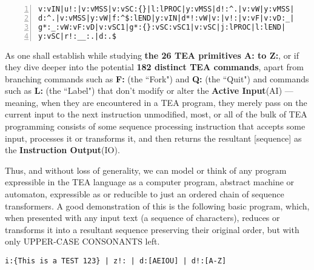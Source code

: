 \documentclass[12pt,a4paper]{article}
\begin{document}
 \small
  \begin{tcolorbox}[teaterminalstyle, title=TEA Program: SC-Generator Minified, breakable]
  \begin{lstlisting}[language=TEA, caption={SC-Generator Minified}, label={LSTSCGENMINI}, numbers=left]
v:vIN|u!:|v:vMSS|v:vSC:{}|l:lPROC|y:vMSS|d!:^.|v:vW|y:vMSS|
d:^.|v:vMSS|y:vW|f:^$:lEND|y:vIN|d*!:vW|v:|v!:|v:vF|v:vD:_|
g*:_:vW:vF:vD|v:vSC1|g*:{}:vSC:vSC1|v:vSC|j:lPROC|l:lEND|
y:vSC|r!:__:.|d:.$
   \end{lstlisting}
  \end{tcolorbox}
  \vspace{1cm}
  
 
 As one shall establish while studying \textbf{the 26 TEA primitives A: to Z:}\cite{Lutalo2024TEATAZ}, or if they dive deeper into the potential \textbf{182 distinct TEA commands}\cite{Lutalo2024TEATAZ}, apart from branching commands such as \textbf{F:} (the ``Fork") and \textbf{Q:} (the ``Quit") and commands such as \textbf{L:} (the ``Label") that don't modify or alter the \textbf{Active Input}(AI)\cite{Lutalo2024TEATAZ} --- meaning, when they are encountered in a TEA program, they merely pass on  the current input to the next instruction unmodified, most, or all of the bulk of TEA programming consists of some sequence processing instruction that accepts some input, processes it or transforms it, and then returns the resultant [sequence] as the \textbf{Instruction Output}(IO).
 
 Thus, and without loss of generality, we can model or think of any program expressible in the TEA language as a computer program, abstract machine or automaton, expressible as or reducible to just an ordered chain of sequence transformers. A good demonstration of this is the following basic program, which, when presented with any input text (a sequence of characters), reduces or transforms it into a resultant sequence preserving their original order, but with only UPPER-CASE CONSONANTS left.\\
 
 \small
  \begin{tcolorbox}[teaterminalstyle, title=TEA Program: CONSONANT FILTER, breakable]
    \begin{lstlisting}[language=TEA,breaklines=true]
i:{This is a TEST 123} | z!: | d:[AEIOU] | d!:[A-Z]
   \end{lstlisting}
  \end{tcolorbox}
  \vspace{1cm}
 
\end{document}
